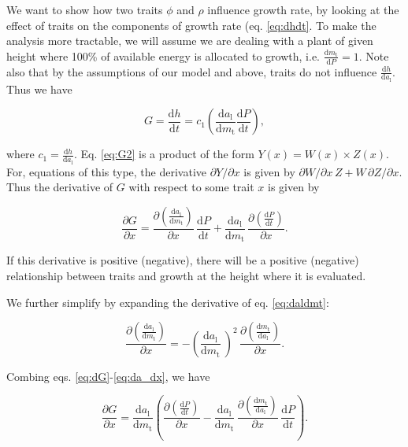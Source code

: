 \documentclass[12pt, a4paper]{article}
\begin{document}
\begin{appendices}
We want to show how two traits $\phi$ and $\rho$ influence growth rate,
by looking at the effect of
traits on the components of growth rate (eq. \ref{eq:dhdt}. To make
the analysis more tractable, we will assume we are dealing with a plant of
given height where 100\% of available energy is allocated to growth,
i.e. $\frac{\textrm{d}m_\textrm{t}}{\textrm{d}P}=1$. Note also
that by the assumptions of our model and above, traits do not influence
$\frac{\textrm{d}h} {\textrm{d}a_\textrm{l}}$. Thus we have

\begin{equation} \label{eq:G2}
G = \frac{\textrm{d}h}{\textrm{d}t} = c_1   \left(\frac{\textrm{d}a_\textrm{l}} {\textrm{d}m_\textrm{t}}  \frac{ \textrm{d}P} {\textrm{d}t} \right),
\end{equation}

where $c_1 = \frac{\textrm{d}h}{\textrm{d}a_\textrm{l}}$. Eq.
\ref{eq:G2} is a product of the form $Y(x) = W(x) \times Z(x)$. For,
equations of this type, the derivative $\partial{Y}/\partial{x}$ is
given by $\partial{W}/\partial{x} \, Z + W \, \partial{Z}/\partial{x}$. Thus
the derivative of $G$ with respect to some trait $x$  is given by

\begin{equation} \label{eq:dG}
\frac{\partial G} {\partial x} =
\frac{\partial \left(\frac{\textrm{d}a_\textrm{l}} {\textrm{d}m_\textrm{t}}\right)}{\partial x}
 \, \frac{ \textrm{d}P} {\textrm{d}t}
+ \frac{\textrm{d}a_\textrm{l}} {\textrm{d}m_\textrm{t}}
\, \frac{\partial \left( \frac{ \textrm{d}P} {\textrm{d}t}\right)}{\partial x}.
\end{equation}

If this derivative is positive (negative), there will be a positive (negative) relationship
between traits and growth at the height where it is evaluated.

We further simplify by expanding the derivative of eq. \ref{eq:daldmt}:

\begin{equation} \label{eq:da_dx}
\frac{\partial \left(\frac{\textrm{d}a_\textrm{l}} {\textrm{d}m_\textrm{t}}\right)}
{\partial x} = -\left(\frac{\textrm{d}a_\textrm{l}} {\textrm{d}m_\textrm{t}}\ \right)^2
\, \frac{\partial \left(\frac{\textrm{d}m_\textrm{t}} {\textrm{d}a_\textrm{l}}\right)
}{\partial x}.
\end{equation}

Combing eqs. \ref{eq:dG}-\ref{eq:da_dx}, we have

\begin{equation} \label{eq:dG2}
\frac{\partial G} {\partial x} =
\frac{\textrm{d}a_\textrm{l}} {\textrm{d}m_\textrm{t}}
\left(
\frac{\partial \left( \frac{ \textrm{d}P} {\textrm{d}t}\right)}{\partial x}
- \frac{\textrm{d}a_\textrm{l}} {\textrm{d}m_\textrm{t}}
\,  \frac{\partial \left(\frac{\textrm{d}m_\textrm{t}} {\textrm{d}a_\textrm{l}}\right)
}{\partial x}
 \, \frac{ \textrm{d}P} {\textrm{d}t}
\right).
\end{equation}


\end{appendices}
\end{document}
